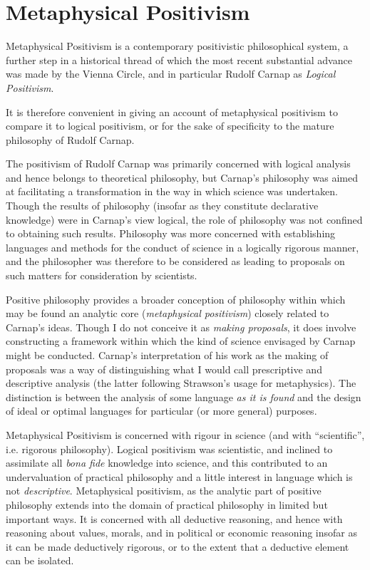 
\chapter{Metaphysical Positivism}

Metaphysical Positivism is a contemporary positivistic philosophical
system, a further step in a historical thread of which the most recent
substantial advance was made by the Vienna Circle, and in particular
Rudolf Carnap as \emph{Logical Positivism}.

It is therefore convenient in giving an account of metaphysical
positivism to compare it to logical positivism, or for the sake of
specificity to the mature philosophy of Rudolf Carnap.

The positivism of Rudolf Carnap was primarily concerned with logical
analysis and hence belongs to theoretical philosophy, but Carnap's
philosophy was aimed at facilitating a transformation in the way in
which science was undertaken.
Though the results of philosophy (insofar as they constitute
declarative knowledge) were in Carnap's view logical, the role of
philosophy was not confined to obtaining such results.
Philosophy was more concerned with establishing languages and methods
for the conduct of science in a logically rigorous manner, and the
philosopher was therefore to be considered as leading to proposals on
such matters for consideration by scientists.

Positive philosophy provides a broader conception of philosophy within
which may be found an analytic core (\emph{metaphysical positivism})
closely related to Carnap's ideas.
Though I do not conceive it as \emph{making proposals}, it does
involve constructing a framework within which the kind of science
envisaged by Carnap might be conducted.
Carnap's interpretation of his work as the making of proposals was a
way of distinguishing what I would call prescriptive and descriptive
analysis (the latter following Strawson's usage for metaphysics).
The distinction is between the analysis of some language \emph{as it
  is found} and the design of ideal or optimal languages for
particular (or more general) purposes.

Metaphysical Positivism is concerned with rigour in science (and with
``scientific'', i.e. rigorous philosophy). 
Logical positivism was scientistic, and inclined to assimilate all
{\it bona fide} knowledge into science, and this contributed to an
undervaluation of practical philosophy and a little interest in
language which is not \emph{descriptive}.
Metaphysical positivism, as the analytic part of positive philosophy
extends into the domain of practical philosophy in limited but
important ways.
It is concerned with all deductive reasoning, and hence with reasoning
about values, morals, and in political or economic reasoning insofar
as it can be made deductively rigorous, or to the extent that a
deductive element can be isolated.

